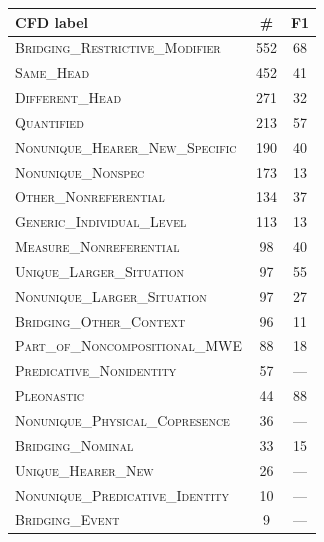 \documentclass[portrait,final]{baposter}
\begin{document}
\begin{poster}
{\begin{left}
\begin{tabular}{l|c|c}
 \multicolumn{1}{p{9em}|}{\bf \normalsize{CFD label}} & \multicolumn{1}{c|}{\bf \normalsize{\#}}& \multicolumn{1}{c}{\bf \normalsize{F1}}	\\\hline %
\textsc{Bridging\_Restrictive\_Modifier} & 552 & 68 \\
\textsc{Same\_Head} & 452 & 41 \\
\textsc{Different\_Head} & 271 & 32 \\
\textsc{Quantified} & 213 & 57 \\
\textsc{Nonunique\_Hearer\_New\_Specific} & 190 & 40 \\
\textsc{Nonunique\_Nonspec} & 173 & 13 \\
\textsc{Other\_Nonreferential} & 134 & 37 \\
\textsc{Generic\_Individual\_Level} & 113 & 13 \\
\textsc{Measure\_Nonreferential} & 98 & 40 \\
\textsc{Unique\_Larger\_Situation} & 97 & 55 \\
\textsc{Nonunique\_Larger\_Situation} & 97 & 27 \\
\textsc{Bridging\_Other\_Context} & 96 & 11 \\
\textsc{Part\_of\_Noncompositional\_MWE} & 88 & 18 \\
\textsc{Predicative\_Nonidentity} & 57 & --- \\
\textsc{Pleonastic} & 44 & 88 \\
\textsc{Nonunique\_Physical\_Copresence} & 36 & --- \\
\textsc{Bridging\_Nominal} & 33 & 15 \\
\textsc{Unique\_Hearer\_New} & 26 & --- \\
\textsc{Nonunique\_Predicative\_Identity} & 10 & --- \\
\textsc{Bridging\_Event} & 9 & --- \\
\end{tabular} 
\end{left}
}
\end{poster}
\end{document}
